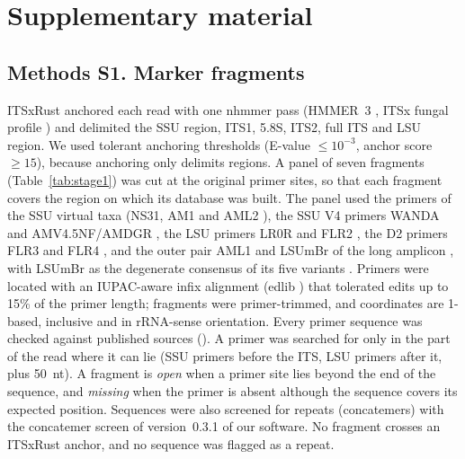 \documentclass[11pt]{article}
\begin{document}
\clearpage
\renewcommand{\thetable}{S\arabic{table}}
\renewcommand{\thefigure}{S\arabic{figure}}
\renewcommand{\theHtable}{S\arabic{table}}
\renewcommand{\theHfigure}{S\arabic{figure}}
\setcounter{table}{0}
\setcounter{figure}{0}
\section*{Supplementary material}

\subsection*{Methods S1. Marker fragments}
ITSxRust anchored each read with one nhmmer pass (HMMER~3 \cite{eddy2011hmmer}, ITSx fungal profile
\cite{bengtsson2013itsx}) and delimited the SSU region, ITS1, 5.8S, ITS2, full ITS and LSU region. We used tolerant
anchoring thresholds (E-value $\le10^{-3}$, anchor score $\ge15$), because anchoring only delimits regions. A panel
of seven fragments (Table~\ref{tab:stage1}) was cut at the original primer sites, so that each fragment covers the
region on which its database was built. The panel used the primers of the SSU virtual taxa (NS31, AM1 and AML2
\cite{simon1992specific,helgason1998ploughing,lee2008improved,opik2010maarjam}), the SSU V4 primers WANDA and
AMV4.5NF/AMDGR \cite{dumbrell2011distinct,sato2005}, the LSU primers LR0R \cite{bunyard1994morchella,delavaux2021lsu}
and FLR2 \cite{trouvelot1999visualization}, the D2 primers FLR3 and FLR4 \cite{gollotte2004diversity}, and the outer
pair AML1 and LSUmBr \cite{lee2008improved,kruger2009dna} of the long amplicon \cite{kolarikova2021pacbio}, with
LSUmBr as the degenerate consensus of its five variants \cite{schlaeppi2016profiling}. Primers were located with an
IUPAC-aware infix alignment (edlib \cite{sosic2017edlib}) that tolerated edits up to 15\% of the primer length;
fragments were primer-trimmed, and coordinates are 1-based, inclusive and in rRNA-sense orientation. Every primer
sequence was checked against published sources (). A primer was searched for only in
the part of the read where it can lie (SSU primers before the ITS, LSU primers after it, plus 50~nt). A fragment is
\emph{open} when a primer site lies beyond the end of the sequence, and \emph{missing} when the primer is absent
although the sequence covers its expected position. Sequences were also screened for repeats (concatemers) with the
concatemer screen of version~0.3.1 of our software. No fragment crosses an ITSxRust anchor, and no sequence was
flagged as a repeat.
\end{document}

